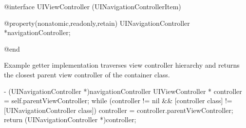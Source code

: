 \documentclass[10pt]{extarticle}
\newenvironment{codelisting}
{\footnotesize\mdframed[middlelinewidth=0.5pt, middlelinecolor=BaliHaiColor, skipabove=15pt]\verbatim}
{\endverbatim\endmdframed\vspace{12pt}\normalsize}
\begin{document}
\begin{codelisting}
@interface UIViewController (UINavigationControllerItem)

@property(nonatomic,readonly,retain) UINavigationController *navigationController;

@end
\end{codelisting}

Example getter implementation traverses view controller hierarchy and returns the closest parent view controller of the container class.

\begin{codelisting}
- (UINavigationController *)navigationController
{
    UIViewController * controller = self.parentViewController;
    while (controller != nil && [controller class] != [UINavigationController class]) {
        controller = controller.parentViewController;
    }
    return (UINavigationController *)controller;
}
\end{codelisting}
\end{document}
